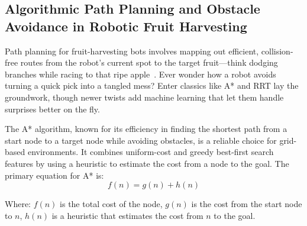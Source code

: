\documentclass[pdflatex,sn-mathphys-num]{sn-jnl}
\begin{document}
\subsection{Algorithmic Path Planning and Obstacle Avoidance in Robotic Fruit Harvesting}
Path planning for fruit-harvesting bots involves mapping out efficient, collision-free routes from the robot's current spot to the target fruit—think dodging branches while racing to that ripe apple~\cite {Leong:2024_review}. Ever wonder how a robot avoids turning a quick pick into a tangled mess? Enter classics like A* and RRT lay the groundwork, though newer twists add machine learning that let them handle surprises better on the fly.

The A* algorithm, known for its efficiency in finding the shortest path from a start node to a target node while avoiding obstacles, is a reliable choice for grid-based environments. It combines uniform-cost and greedy best-first search features by using a heuristic to estimate the cost from a node to the goal. The primary equation for A* is:
\begin{equation}
f(n) = g(n) + h(n)
\label{eq:astar}
\end{equation}

Where:
$f(n)$ is the total cost of the node, 
$g(n)$ is the cost from the start node to $n$, 
$h(n)$ is a heuristic that estimates the cost from $n$ to the goal.
\end{document}

